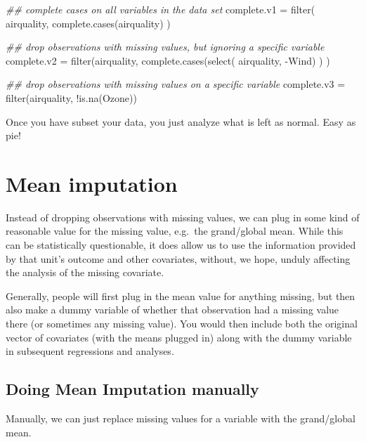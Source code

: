 \documentclass[
  letterpaper,
  DIV=11,
  numbers=noendperiod]{scrreprt}
\newenvironment{Shaded}{}{}
\newcommand{\DocumentationTok}[1]{\textcolor[rgb]{0.73,0.13,0.13}{\textit{#1}}}
\newcommand{\FunctionTok}[1]{\textcolor[rgb]{0.02,0.16,0.49}{#1}}
\newcommand{\NormalTok}[1]{#1}
\newcommand{\OtherTok}[1]{\textcolor[rgb]{0.00,0.44,0.13}{#1}}
\newcommand{\SpecialCharTok}[1]{\textcolor[rgb]{0.25,0.44,0.63}{#1}}
\begin{document}
\begin{Shaded}
\begin{Highlighting}[]
\DocumentationTok{\#\# complete cases on all variables in the data set }
\NormalTok{complete.v1 }\OtherTok{=} \FunctionTok{filter}\NormalTok{( airquality, }\FunctionTok{complete.cases}\NormalTok{(airquality) )}
  
\DocumentationTok{\#\# drop observations with missing values, but ignoring a specific variable  }
\NormalTok{complete.v2 }\OtherTok{=} \FunctionTok{filter}\NormalTok{(airquality, }\FunctionTok{complete.cases}\NormalTok{(}\FunctionTok{select}\NormalTok{( airquality, }\SpecialCharTok{{-}}\NormalTok{Wind) ) )}

\DocumentationTok{\#\# drop observations with missing values on a specific variable  }
\NormalTok{complete.v3 }\OtherTok{=} \FunctionTok{filter}\NormalTok{(airquality, }\SpecialCharTok{!}\FunctionTok{is.na}\NormalTok{(Ozone))}
\end{Highlighting}
\end{Shaded}

Once you have subset your data, you just analyze what is left as normal.
Easy as pie!

\section{Mean imputation}\label{mean-imputation}

Instead of dropping observations with missing values, we can plug in
some kind of reasonable value for the missing value, e.g.~the
grand/global mean. While this can be statistically questionable, it does
allow us to use the information provided by that unit's outcome and
other covariates, without, we hope, unduly affecting the analysis of the
missing covariate.

Generally, people will first plug in the mean value for anything
missing, but then also make a dummy variable of whether that observation
had a missing value there (or sometimes any missing value). You would
then include both the original vector of covariates (with the means
plugged in) along with the dummy variable in subsequent regressions and
analyses.

\subsection{Doing Mean Imputation
manually}\label{doing-mean-imputation-manually}

Manually, we can just replace missing values for a variable with the
grand/global mean.
\end{document}
